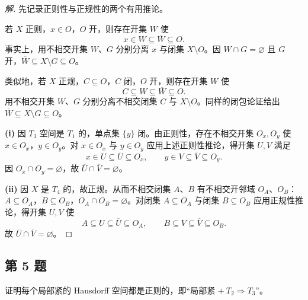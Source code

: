 \documentclass[11pt,a4paper]{article}
\theoremstyle{definition}
\newenvironment{solution}{\begin{proof}[解]}{\end{proof}}
\begin{document}
\begin{solution}
先记录正则性与正规性的两个有用推论。

若 $X$ 正则，$x \in O$，$O$ 开，则存在开集 $W$ 使
\[
  x \in W \subseteq \overline{W} \subseteq O.
\]
事实上，用不相交开集 $W$、$G$ 分别分离 $x$ 与闭集 $X \setminus O$。因 $W \cap G = \varnothing$ 且 $G$ 开，$\overline{W} \subseteq X \setminus G \subseteq O$。

类似地，若 $X$ 正规，$C \subseteq O$，$C$ 闭，$O$ 开，则存在开集 $W$ 使
\[
  C \subseteq W \subseteq \overline{W} \subseteq O.
\]
用不相交开集 $W$、$G$ 分别分离不相交闭集 $C$ 与 $X \setminus O$。同样的闭包论证给出 $\overline{W} \subseteq X \setminus G \subseteq O$。

\textbf{(i)} 因 $T_3$ 空间是 $T_1$ 的，单点集 $\{y\}$ 闭。由正则性，存在不相交开集 $O_x, O_y$ 使 $x \in O_x$，$y \in O_y$。对 $x \in O_x$ 与 $y \in O_y$ 应用上述正则性推论，得开集 $U, V$ 满足
\[
  x \in U \subseteq \overline{U} \subseteq O_x, \qquad y \in V \subseteq \overline{V} \subseteq O_y.
\]
因 $O_x \cap O_y = \varnothing$，故 $\overline{U} \cap \overline{V} = \varnothing$。

\textbf{(ii)} 因 $X$ 是 $T_4$ 的，故正规。从而不相交闭集 $A$、$B$ 有不相交开邻域 $O_A$、$O_B$：$A \subseteq O_A$，$B \subseteq O_B$，$O_A \cap O_B = \varnothing$。对闭集 $A \subseteq O_A$ 与闭集 $B \subseteq O_B$ 应用正规性推论，得开集 $U, V$ 使
\[
  A \subseteq U \subseteq \overline{U} \subseteq O_A, \qquad B \subseteq V \subseteq \overline{V} \subseteq O_B.
\]
故 $\overline{U} \cap \overline{V} = \varnothing$。
\end{solution}

\subsection{第 5 题}

证明每个局部紧的 Hausdorff 空间都是正则的，即“局部紧 $+\ T_2 \Rightarrow T_3$”。
\end{document}
